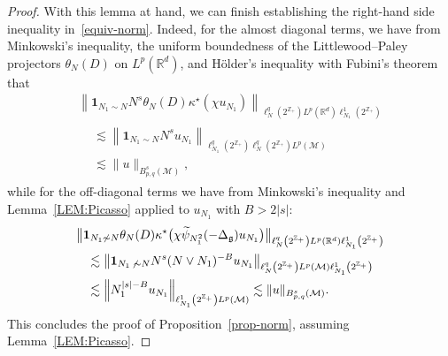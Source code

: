\documentclass[10pt,a4paper]{article}
\newcommand{\Z}{\mathbb{Z}}
\newcommand{\R}{\mathbb{R}}
\newcommand{\ind}{\mathbf{1}}
\newcommand{\M}{\mathcal{M}}
\newcommand{\g}{\mathfrak{g}}
\newcommand{\Dlg}{\Delta_{\g}}
\newcommand{\kk}{\kappa}
\newcommand{\les}{\lesssim}
\begin{document}
\begin{proof}
With this lemma at hand, we can finish establishing the right-hand side inequality in~\eqref{equiv-norm}. Indeed, for the almost diagonal terms, we have from Minkowski's inequality, the uniform boundedness of the Littlewood--Paley projectors $\theta_N(D)$ on $L^p(\R^d)$, and H\"older's inequality with Fubini's theorem that
\begin{multline*}
\left\|\ind_{N_1\sim N}N^s\theta_N(D)\kk^\star(\chi u_{N_1})\right\|_{\ell^q_N\left(2^{\Z_+}\right) L^p\left(\R^d\right)\ell^1_{N_1}\left(2^{\Z_+}\right)}\\
\begin{aligned}
&\les \left\|\ind_{N_1\sim N}N^s u_{N_1}\right\|_{\ell^q_{N_1}\left(2^{\Z_+}\right)\ell^q_{N}\left(2^{\Z_+}\right) L^p(\M)}\\
&\les \|u\|_{B^s_{p,q}(\M)},
\end{aligned}
\end{multline*}
while for the off-diagonal terms we have from Minkowski's inequality and Lemma~\ref{LEM:Picasso} applied to $u_{N_1}$ with $B>2|s|$:
\begin{multline*}
\big\|\ind_{N_1\not\sim N}\theta_N(D)\kk^{\star}\big(\chi\widetilde{\psi}_{N_1^2}(-\Dlg)u_{N_1}\big)\big\|_{\ell^q_N\left(2^{\Z_+}\right)L^p(\R^d)\ell^1_{N_1}\left(2^{\Z_+}\right)}\\
\begin{aligned}
&\les \left\|\ind_{N_1\,\not\,\sim N}N^s(N\vee N_1)^{-B}u_{N_1}\right\|_{\ell^q_{N}\left(2^{\Z_+}\right)L^p(\M)\ell^1_{N_1}\left(2^{\Z_+}\right)}\\
&\les \left\|N_1^{|s|-B}u_{N_1}\right\|_{\ell^1_{N_1}\left(2^{\Z_+}\right)L^p(\M)} \les \|u\|_{B^s_{p,q}(\M)}.
\end{aligned}
\end{multline*}
This concludes the proof of Proposition~\ref{prop-norm}, assuming Lemma~\ref{LEM:Picasso}.
\end{proof}
\end{document}
